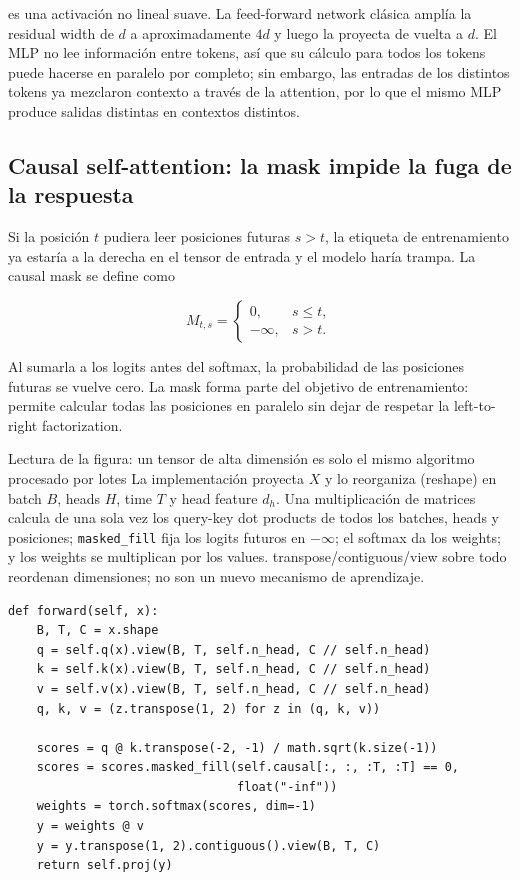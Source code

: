  es una activación no lineal suave. La feed-forward network clásica amplía la residual width de $d$ a aproximadamente $4d$ y luego la proyecta de vuelta a $d$. El MLP no lee información entre tokens, así que su cálculo para todos los tokens puede hacerse en paralelo por completo; sin embargo, las entradas de los distintos tokens ya mezclaron contexto a través de la attention, por lo que el mismo MLP produce salidas distintas en contextos distintos.

\subsection{Causal self-attention: la mask impide la fuga de la respuesta}

Si la posición $t$ pudiera leer posiciones futuras $s>t$, la etiqueta de entrenamiento ya estaría a la derecha en el tensor de entrada y el modelo haría trampa. La causal mask se define como

\[
M_{t,s}=\begin{cases}
0,&s\le t,\\
-\infty,&s>t.
\end{cases}
\]

Al sumarla a los logits antes del softmax, la probabilidad de las posiciones futuras se vuelve cero. La mask forma parte del objetivo de entrenamiento: permite calcular todas las posiciones en paralelo sin dejar de respetar la left-to-right factorization.


\begin{knowledgebox}{Lectura de la figura: un tensor de alta dimensión es solo el mismo algoritmo procesado por lotes}
La implementación proyecta $X$ y lo reorganiza (reshape) en batch $B$, heads $H$, time $T$ y head feature $d_h$. Una multiplicación de matrices calcula de una sola vez los query-key dot products de todos los batches, heads y posiciones; \texttt{masked\_fill} fija los logits futuros en $-\infty$; el softmax da los weights; y los weights se multiplican por los values. transpose/contiguous/view sobre todo reordenan dimensiones; no son un nuevo mecanismo de aprendizaje.
\end{knowledgebox}

\begin{lstlisting}[caption={Forward mínimo de causal self-attention con anotaciones de forma.}]
def forward(self, x):
    B, T, C = x.shape
    q = self.q(x).view(B, T, self.n_head, C // self.n_head)
    k = self.k(x).view(B, T, self.n_head, C // self.n_head)
    v = self.v(x).view(B, T, self.n_head, C // self.n_head)
    q, k, v = (z.transpose(1, 2) for z in (q, k, v))

    scores = q @ k.transpose(-2, -1) / math.sqrt(k.size(-1))
    scores = scores.masked_fill(self.causal[:, :, :T, :T] == 0,
                                float("-inf"))
    weights = torch.softmax(scores, dim=-1)
    y = weights @ v
    y = y.transpose(1, 2).contiguous().view(B, T, C)
    return self.proj(y)
\end{lstlisting}

